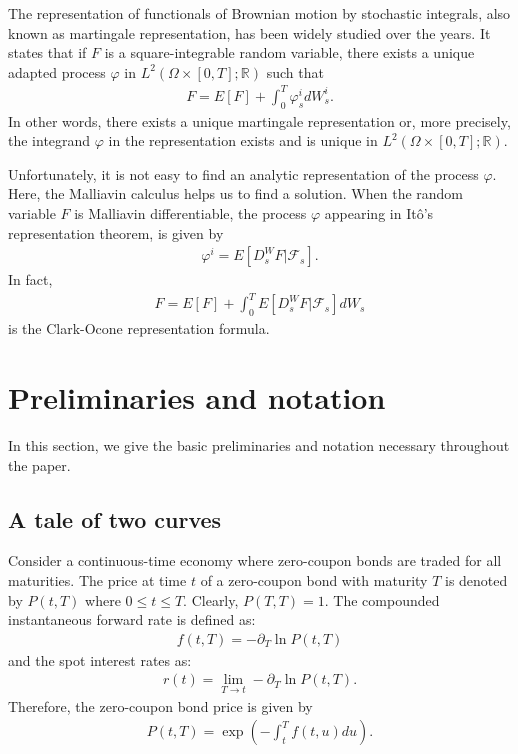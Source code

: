 \documentclass[a4paper,10pt]{article}
\newcommand{\1}{\mathbf{1}}
\begin{document}
\medbreak

The representation of functionals of Brownian motion by stochastic integrals, also known as martingale representation, has been widely studied over the years. It states that if $F$ is a square-integrable random variable, there exists a unique adapted process $\varphi$ in $L^{2}(\Omega \times \left[0,T\right]; \mathbb{R})$ such that
\begin{eqnarray*}
F=E\left[F\right] +\int^{T}_{0} \varphi^{i}_{s} dW^{i}_{s}.
\end{eqnarray*}
In other words, there exists a unique martingale representation or, more precisely, the integrand $\varphi$ in the representation exists and is unique in $L^{2}(\Omega \times \left[0,T\right]; \mathbb{R})$.

\medbreak

Unfortunately, it is not easy to find an analytic representation of the process $\varphi$. Here, the Malliavin calculus helps us to find a solution. When the random variable $F$ is Malliavin differentiable, the process $\varphi$ appearing in It\^o's representation theorem, is given by
\begin{eqnarray*}
\varphi^{i}=E\left[D^{W}_{s}F|\mathcal{F}_{s}\right].
\end{eqnarray*}
In fact,
\begin{eqnarray}\label{clark-okone}
F=E\left[F\right] + \int^{T}_{0} E\left[D^{W}_{s}F|\mathcal{F}_{s}\right] dW_{s}
\end{eqnarray}
is the Clark-Ocone representation formula. 



\section{Preliminaries and notation}\label{sec:Notation}
In this section, we give the basic preliminaries and notation necessary throughout the paper.
\subsection{A tale of two curves}
Consider a continuous-time economy where zero-coupon bonds are traded for all maturities. The price at time $t$ of a zero-coupon bond with maturity $T$ is denoted by $P(t,T)$ where $0\leq t \leq T$. Clearly, $P(T,T)=1$. The compounded instantaneous forward rate is defined as:
\begin{eqnarray*}
f(t,T)= -\partial_{T}\ln P(t,T)
\end{eqnarray*}
and the spot interest rates as:
\begin{eqnarray*}
r(t)=\lim_{T\longrightarrow t} -\partial_{T}\ln P(t,T).
\end{eqnarray*}
Therefore, the zero-coupon bond price is given by
\begin{eqnarray*}
P(t,T)=\exp\left(-\int^{T}_{t} f(t,u) du\right).
\end{eqnarray*}
\end{document}
